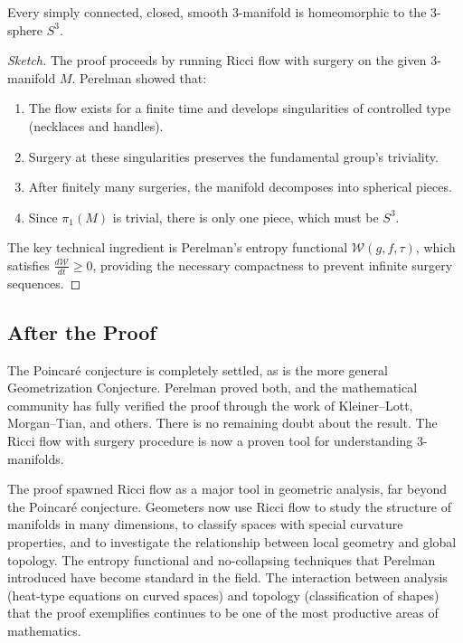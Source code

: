 \begin{theorem}
Every simply connected, closed, smooth 3-manifold is homeomorphic to the 3-sphere $S^3$.
\end{theorem}

\begin{proof}[Sketch]
The proof proceeds by running Ricci flow with surgery on the given 3-manifold $M$. Perelman showed that:
\begin{enumerate}
\item The flow exists for a finite time and develops singularities of controlled type (necklaces and handles).
\item Surgery at these singularities preserves the fundamental group's triviality.
\item After finitely many surgeries, the manifold decomposes into spherical pieces.
\item Since $\pi_1(M)$ is trivial, there is only one piece, which must be $S^3$.
\end{enumerate}
The key technical ingredient is Perelman's entropy functional $\mathcal{W}(g,f,\tau)$, which satisfies $\frac{d\mathcal{W}}{dt} \geq 0$, providing the necessary compactness to prevent infinite surgery sequences.
\end{proof}

\subsection{After the Proof}

The Poincar\'e conjecture is completely settled, as is the more general Geometrization Conjecture. Perelman proved both, and the mathematical community has fully verified the proof through the work of Kleiner--Lott, Morgan--Tian, and others. There is no remaining doubt about the result. The Ricci flow with surgery procedure is now a proven tool for understanding 3-manifolds.

The proof spawned Ricci flow as a major tool in geometric analysis, far beyond the Poincar\'e conjecture. Geometers now use Ricci flow to study the structure of manifolds in many dimensions, to classify spaces with special curvature properties, and to investigate the relationship between local geometry and global topology. The entropy functional and no-collapsing techniques that Perelman introduced have become standard in the field. The interaction between analysis (heat-type equations on curved spaces) and topology (classification of shapes) that the proof exemplifies continues to be one of the most productive areas of mathematics.

